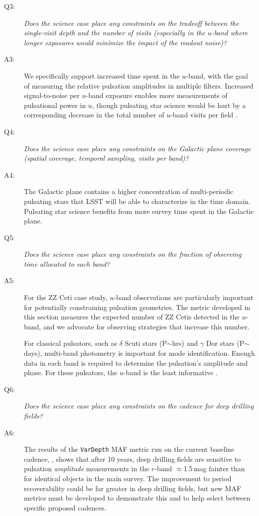 \begin{description}
 \item[Q3:] {\it Does the science case place any constraints on the
 tradeoff between the single-visit depth and the number of visits
 (especially in the $u$-band where longer exposures would minimize the
 impact of the readout noise)?}

 \item[A3:] We specifically support increased time spent in the
 $u$-band, with the goal of measuring the relative pulsation amplitudes
 in multiple filters. Increased signal-to-noise per $u$-band exposure enables
 more measurements of pulsational power in $u$, though pulsating star
 science would be hurt by a corresponding decrease in the total number of
 $u$-band visits per field .

 \item[Q4:] {\it Does the science case place any constraints on the
 Galactic plane coverage (spatial coverage, temporal sampling, visits per
 band)?}

 \item[A4:] The Galactic plane contains a higher concentration of multi-periodic
 pulsating stars that LSST will be able to characterize in the time domain.
 Pulsating star science benefits from more survey time spent in the Galactic
 plane.

 \item[Q5:] {\it Does the science case place any constraints on the
 fraction of observing time allocated to each band?}

 \item[A5:] For the ZZ Ceti case study, $u$-band observations are particularly
 important for potentially constraining pulsation geometries. The metric
 developed in this section measures the expected number of ZZ Cetis
 detected in the $u$-band, and we advocate for observing strategies
 that increase this number.

 For classical pulsators, such as $\delta$ Scuti stars (P$\sim$hrs) and $\gamma$ Dor stars (P$\sim$days), multi-band photometry is important for mode identification. Enough data in each band is required to determine the pulsation's amplitude and phase. For these pulsators, the $u$-band is the least informative \citep[e.g.,][]{1990A&A...234..262G}.

 \item[Q6:] {\it Does the science case place any constraints on the
 cadence for deep drilling fields?}

 \item[A6:] The results of the {\tt VarDepth} MAF metric run on the
 current baseline cadence, , shows that after
 10 years, deep drilling fields are sensitive to pulsation
 \emph{amplitude} measurements in the $r$-band $\approx$1.5\,mag fainter
 than for identical objects in the main survey.  The improvement to
 period recoverability could be far greater in deep drilling fields, but
 new MAF metrics must be developed to demonstrate this and to help
 select between specific proposed cadences.


\end{description}
